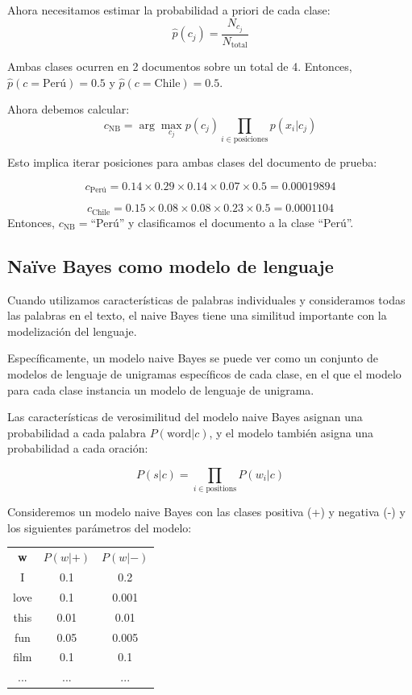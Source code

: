 \documentclass[11pt,fleqn]{book} %
\begin{document}
\begin{example}
Ahora necesitamos estimar la probabilidad a priori de cada clase:
    \[
    \hat{p}(c_j) = \frac{N_{c_j}}{N_{\text{total}}}
    \]

Ambas clases ocurren en 2 documentos sobre un total de 4. Entonces, $\hat{p}(c=\text{Perú})=0.5$ y $\hat{p}(c=\text{Chile})=0.5$.

Ahora debemos calcular:
\[
c_{\text{NB}} = \arg\max_{c_j} p(c_j) \prod_{i \in \text{posiciones}} p(x_i | c_j)
\]

Esto implica iterar posiciones para ambas clases del documento de prueba:

\[
c_{\text{Perú}} = 0.14\times 0.29\times 0.14\times 0.07\times 0.5=0.00019894
\]

\[
c_{\text{Chile}} = 0.15\times 0.08\times 0.08\times 0.23\times 0.5=0.0001104
\]
Entonces, $c_{\text{NB}}=$``Perú'' y clasificamos el documento a la clase ``Perú''.
\end{example}




\subsection{Naïve Bayes como modelo de lenguaje}

Cuando utilizamos características de palabras individuales y consideramos todas las palabras en el texto, el naive Bayes tiene una similitud importante con la modelización del lenguaje.

Específicamente, un modelo naive Bayes se puede ver como un conjunto de modelos de lenguaje de unigramas específicos de cada clase, en el que el modelo para cada clase instancia un modelo de lenguaje de unigrama.

Las características de verosimilitud del modelo naive Bayes asignan una probabilidad a cada palabra $P(\text{word}|c)$, y el modelo también asigna una probabilidad a cada oración:

\[P(s|c) = \prod_{i\in \text{positions}} P(w_i|c)\]

Consideremos un modelo naive Bayes con las clases positiva (+) y negativa (-) y los siguientes parámetros del modelo:

\begin{center}
\begin{tabular}{ccc}
\textbf{w} & $P(w|+)$ & $P(w|-)$ \\
I & 0.1 & 0.2 \\
love & 0.1 & 0.001 \\
this & 0.01 & 0.01 \\
fun & 0.05 & 0.005 \\
film & 0.1 & 0.1 \\
... & ... & ...
\end{tabular}
\end{center}
\end{document}
